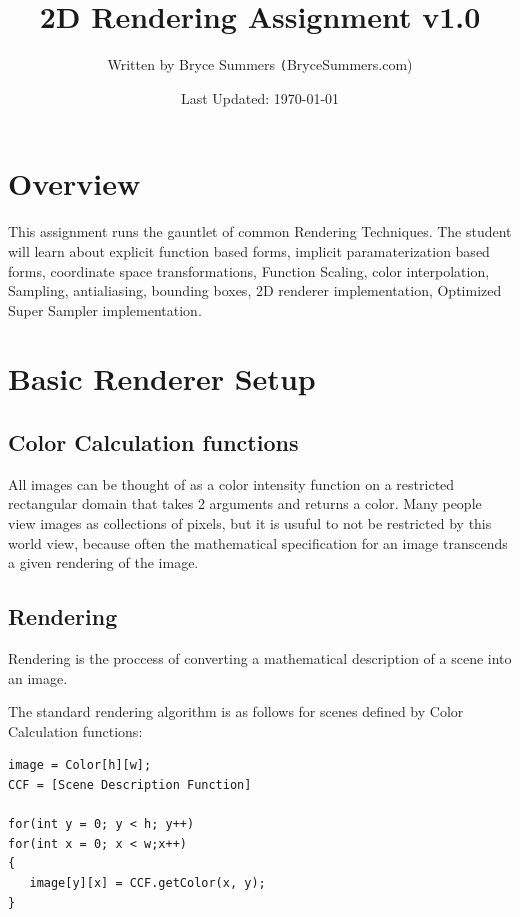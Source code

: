 \documentclass[12pt, letterpaper]{article}
\begin{document}
\title{\color{blue}2D Rendering Assignment v1.0}
\author{Written by Bryce Summers \texttt(BryceSummers.com)}
\date{\color{red}Last Updated: \today}
\maketitle

\tableofcontents 

\section{Overview}

This assignment runs the gauntlet of common Rendering Techniques. The student will learn about explicit function based forms, implicit paramaterization based forms, coordinate space transformations, Function Scaling, color interpolation, Sampling, antialiasing, bounding boxes, 2D renderer implementation, Optimized Super Sampler implementation.

\section{Basic Renderer Setup}

\subsection{Color Calculation functions}
All images can be thought of as a color intensity function on a restricted rectangular domain that takes 2 arguments and returns a color. Many people view images as collections of pixels, but it is usuful to not be restricted by this world view, because often the mathematical specification for an image transcends a given rendering of the image.

\subsection{Rendering}
Rendering is the proccess of converting a mathematical description of a scene into an image.

The standard rendering algorithm is as follows for scenes defined by Color Calculation functions:
\begin{verbatim}
image = Color[h][w];
CCF = [Scene Description Function]

for(int y = 0; y < h; y++)
for(int x = 0; x < w;x++)
{
   image[y][x] = CCF.getColor(x, y);
}
\end{verbatim}
\end{document}
